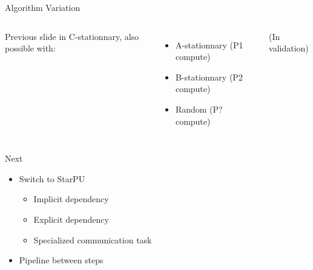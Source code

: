 \documentclass[tikz,presentation,border=10pt]{beamer}
\begin{document}
\begin{frame}{Algorithm Variation}
\begin{columns}
    Previous slide in C-stationnary, also possible with:
    \begin{itemize}
        \item A-stationnary (P1 compute)
        \item B-stationnary (P2 compute)
        \item Random (P? compute)
    \end{itemize}

    (In validation)
\end{columns}

\end{frame}

\begin{frame}{Next}
    \begin{itemize}
        \item Switch to StarPU
              \begin{itemize}
                  \item Implicit dependency
                  \item Explicit dependency
                  \item Specialized communication task
              \end{itemize}
        \item Pipeline between steps
    \end{itemize}
\end{frame}
\end{document}
